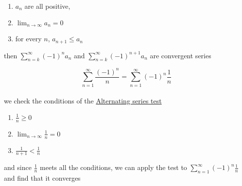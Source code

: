 \documentclass[a4paper,12pt]{article}
\newcommand{\?}{\stackrel{?}{=}}
\begin{document}
\begin{enumerate}
\item \(a_{n}\) are all positive,\\[0pt]
\item \(\lim_{n\to\infty} a_n = 0\)\\[0pt]
\item for every \(n\), \(a_{n+1} \leq a_n\)\\[0pt]
\end{enumerate}

then \(\sum_{n=k}^{\infty} (-1)^n a_n\) and \(\sum_{n=k}^{\infty} (-1)^{n+1} a_n\) are convergent series\\[0pt]

\begin{my_example}
\[
  \sum_{n=1}^{\infty} \frac{(-1)^n}{n} = \sum_{n=1}^{\infty} (-1)^n\frac{1}{n}
\]\\[0pt]
we check the conditions of the \hyperref[sec:orgcbff953]{Alternating series test}\\[0pt]
\begin{enumerate}
\item \(\frac{1}{n} \geq 0\)\\[0pt]
\item \(\lim_{n\to \infty} \frac{1}{n} = 0\)\\[0pt]
\item \(\frac{1}{n+1} < \frac{1}{n}\)\\[0pt]
\end{enumerate}
and since \(\frac{1}{n}\) meets all the conditions, we can apply the test to \(\sum_{n=1}^{\infty} (-1)^n\frac{1}{n}\) and find that it converges\\[0pt]
\end{my_example}
\end{document}
